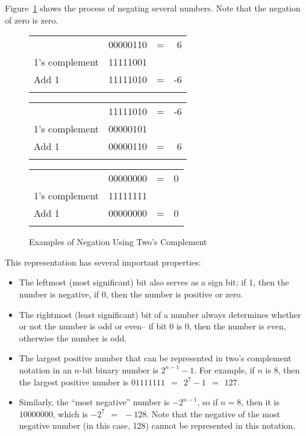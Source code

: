 Figure~\ref{datarep-twos-complement-neg-table}
shows the process of negating several
numbers.  Note that the negation of zero is zero.

\begin{figure}[hbtp]
\caption{Examples of Negation Using Two's Complement}
\begin{center}
\label{datarep-twos-complement-neg-table}

\begin{tabular}{llcr}
                & 00000110      & = & 6 \\
1's complement  & 11111001      &   &   \\
Add 1           & 11111010      & = & -6 \\
\\
\end{tabular}

\begin{tabular}{llcr}
                & 11111010      & = & -6 \\
1's complement  & 00000101      &   &   \\
Add 1           & 00000110      & = & 6 \\
\\
\end{tabular}

\begin{tabular}{llcr}
                & 00000000      & = & 0 \\
1's complement  & 11111111      &   &   \\
Add 1           & 00000000      & = & 0 \\
\\
\end{tabular}
\end{center}
\end{figure}

This representation has several important properties:
\begin{itemize}
\item   The leftmost (most significant)
        bit also serves as a sign bit; if 1, then the number is negative,
        if 0, then the number is positive or zero.

\item   The rightmost (least significant)
        bit of a number always determines
        whether or not the number is odd or even--
        if bit 0 is 0, then the number is even, otherwise the number is odd.

\item   The largest positive number that can be represented in
        two's complement notation in an $n$-bit binary number is $2^{n-1} - 1$.
        For example, if $n$ is $8$, then the largest positive number is
        $01111111 ~~=~~ 2^{7} - 1 ~~=~~ 127$.

\item   Similarly, the ``most negative'' number is $-2^{n-1}$, so
        if $n = 8$, then it is $10000000$, which is $-2^{7} ~~=~~ -128$.
        Note that the negative of the most negative number (in this
        case, 128) cannot be represented in this notation.
\end{itemize}


